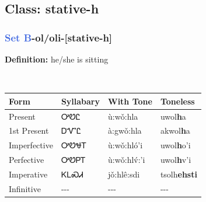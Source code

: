 \subsection*{Class: stative-h}
\nopagebreak
\needspace{2in}
\subsubsection*{\textcolor{RoyalBlue}{Set B}{-}\textbf{ol/oli}{-}[stative-h]}
\nopagebreak
\textbf{Definition: } he/she is sitting
\\[0.5em]
\begin{tabularx}{\textwidth}{l X X X}%
\toprule%
\textbf{Form}&\textbf{Syllabary}&\textbf{With Tone}&\textbf{Toneless}\\%
\midrule%
Present&ᎤᏬᏝ&ù:wǒ:hla&uwol\textbf{h}a\\%
1st Present&ᎠᏉᏝ&à:gwǒ:hla&akwol\textbf{h}a\\%
Imperfective&ᎤᏬᏠᎢ&ù:wǒ:hló’i&uwol\textbf{h}o'i\\%
Perfective&ᎤᏬᏢᎢ&ù:wǒ:hlv́:’i&uwol\textbf{h}v'i\\%
Imperative&ᏦᏞᏍᏗ&jǒ:hlê:sdi&tsolh\textbf{ehsti}\\%
Infinitive&{-}{-}{-}&{-}{-}{-}&{-}{-}{-}\\%
\bottomrule%
\end{tabularx}
\\[1em]